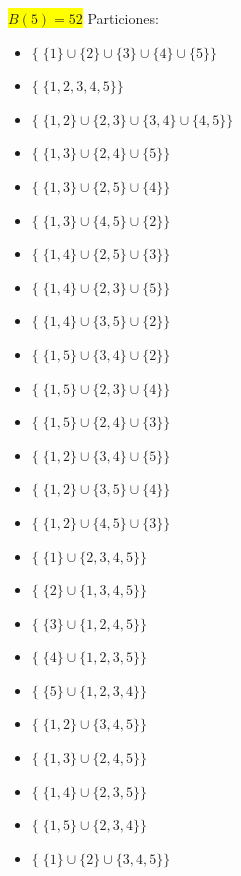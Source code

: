 \begin{enumerate}
\begin{itemize}
        \colorbox{yellow}{$B(5)=52$}
        Particiones: 
            \begin{itemize}
                \item $\{\; \{1\}\cup \{2\} \cup \{3\} \cup \{4\} \cup \{5\}\}$
                \item $\{\; \{1, 2, 3, 4, 5\}\} $
                \item $\{\; \{1,2\} \cup \{2,3\} \cup \{3,4\} \cup \{4,5\}\}$
                \item $\{\; \{1,3\} \cup \{2,4\} \cup \{5\}\}$
                \item $\{\; \{1,3\} \cup \{2,5\} \cup \{4\}\}$
                \item $\{\; \{1,3\} \cup \{4,5\} \cup \{2\}\}$
                \item $\{\; \{1,4\} \cup \{2,5\} \cup \{3\}\}$
                \item $\{\; \{1,4\} \cup \{2,3\} \cup \{5\}\}$
                \item $\{\; \{1,4\} \cup \{3,5\} \cup \{2\}\}$
                \item $\{\; \{1,5\} \cup \{3,4\} \cup \{2\}\}$
                \item $\{\; \{1,5\} \cup \{2,3\} \cup \{4\}\}$
                \item $\{\; \{1,5\} \cup \{2,4\} \cup \{3\}\}$
                \item $\{\; \{1,2\} \cup \{3,4\} \cup \{5\}\}$
                \item $\{\; \{1,2\} \cup \{3,5\} \cup \{4\}\}$
                 \item $\{\; \{1,2\} \cup \{4,5\} \cup \{3\}\}$
                \item $\{\; \{1\} \cup \{2,3,4,5\}\}$
                \item $\{\; \{2\} \cup \{1,3,4,5\}\}$
                \item $\{\; \{3\} \cup \{1,2,4,5\}\}$
                \item $\{\; \{4\} \cup \{1,2,3,5\} \}$
                \item $\{\; \{5\} \cup \{1,2,3,4\} \}$
                \item $\{\; \{1,2\} \cup \{3,4,5\} \}$
                \item $\{\; \{1,3\} \cup \{2,4,5\} \}$
                \item $\{\; \{1,4\} \cup \{2,3,5\} \}$
                \item $\{\; \{1,5\} \cup \{2,3,4\}  \}$
                \item $\{\; \{1\}\cup \{2\} \cup \{3,4,5\} \}$

\end{itemize}
\end{itemize}
\end{enumerate}
